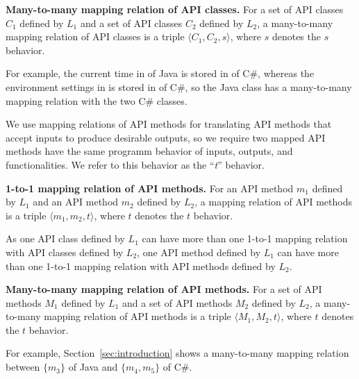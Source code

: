 \textbf{Many-to-many mapping relation of API classes.} For a set of API classes
$C_1$ defined by $L_1$ and a set of API classes $C_2$ defined by
$L_2$, a many-to-many mapping relation of API classes is a triple
$\langle C_1, C_2, s \rangle$, where $s$ denotes the $s$ behavior.

For example, the current time in  of Java
is stored in  of C\#, whereas the
environment settings in  is stored in
 of C\#, so the Java class has a
many-to-many mapping relation with the two C\# classes.

We use mapping relations of API methods for translating API methods
that accept inputs to produce desirable outputs, so we require two
mapped API methods have the same programm behavior of inputs, outputs, and
functionalities. We refer to this behavior as the ``\emph{t}'' behavior.

\textbf{1-to-1 mapping relation of API methods.} For an API method
$m_1$ defined by $L_1$ and an API method $m_2$ defined by
$L_2$, a mapping relation of API methods is a triple $\langle m_1,
m_2, t \rangle$, where $t$ denotes the $t$ behavior.

As one API class defined by $L_1$ can have more than one 1-to-1 mapping
relation with API classes defined by $L_2$, one API method defined by $L_1$ can have more than one 1-to-1 mapping relation with API methods defined by $L_2$.

\textbf{Many-to-many mapping relation of API methods.} For a set of API methods
$M_1$ defined by $L_1$ and a set of API methods $M_2$ defined by
$L_2$, a many-to-many mapping relation of API methods is a triple
$\langle M_1, M_2, t \rangle$, where $t$ denotes the $t$ behavior.

For example, Section~\ref{sec:introduction} shows a many-to-many mapping relation between $\{m_3\}$ of Java and $\{m_4, m_5\}$ of C\#. 